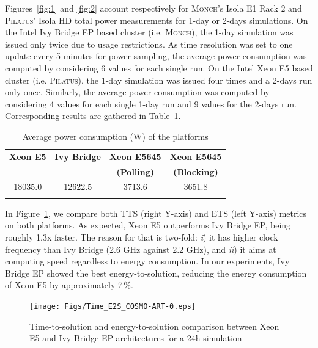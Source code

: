 Figures~\ref{fig:1}   and   \ref{fig:2}   account   respectively   for
\textsc{Monch}'s Isola E1 Rack  2 and \textsc{Pilatus}' Isola HD total
power measurements for  1-day or 2-days simulations. On  the Intel Ivy
Bridge EP  based cluster (i.e.  \textsc{Monch}),  the 1-day simulation
was issued  only twice due  to usage restrictions. As  time resolution
was set to one update every  5 minutes for power sampling, the average
power consumption was computed by considering 6 values for each single
run.  On the Intel Xeon E5 based cluster (i.e.  \textsc{Pilatus}), the
1-day simulation  was issued  four times and  a 2-days run  only once.
Similarly, the average power consumption was computed by considering 4
values  for  each  single  1-day  run  and 9  values  for  the  2-days
run. Corresponding results are gathered in Table~\ref{tab:3}.

\begin{table}[htbf]
  \begin{center}
    \caption{Average power consumption (W) of the platforms}
    \label{tab:3}
    \begin{tabular}{cccc}
      \hline\noalign{\smallskip}
      \textbf{\scriptsize{Xeon E5}} & \textbf{\scriptsize{Ivy Bridge}} & \textbf{\scriptsize{Xeon  E5645}} & \textbf{\scriptsize{Xeon  E5645}}\\
      & & \textbf{\scriptsize{(Polling)}} & \textbf{\scriptsize{(Blocking)}} \\
      \noalign{\smallskip}\hline\noalign{\smallskip}
      18035.0 & 12622.5 & 3713.6 & 3651.8 \\ 
      \noalign{\smallskip}\hline
    \end{tabular}
  \end{center}
\end{table}

In  Figure~\ref{fig:3}, we  compare both  TTS (right  Y-axis)  and ETS
(left  Y-axis)  metrics  on  both  platforms.  As  expected,  Xeon  E5
outperforms Ivy Bridge EP, being  roughly 1.3x faster.  The reason for
that is  two-fold: \emph{i}) it has  higher clock frequency  than Ivy Bridge
(2.6  GHz  against  2.2 GHz),  and  \emph{ii})  it  aims at  computing  speed
regardless to  energy consumption.  In our experiments,  Ivy Bridge EP
showed the best energy-to-solution, reducing the energy consumption of
Xeon E5 by approximately 7\,\%.

\begin{figure}[htbf]
  \texttt{[image: Figs/Time\_E2S\_COSMO-ART-0.eps]}
  \caption{Time-to-solution and energy-to-solution comparison between
    Xeon E5 and Ivy Bridge-EP architectures for a 24h simulation}
  \label{fig:3}
\end{figure}

